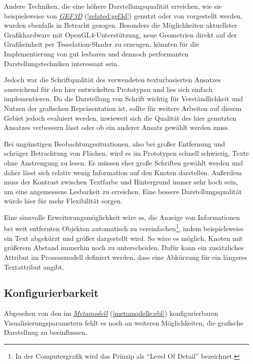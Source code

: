 \documentclass[a4paper,10pt]{sphinxmanual}
\begin{document}
Andere Techniken, die eine höhere Darstellungsqualität erreichen, wie sie beispielsweise von {\hyperref[related:gef3d]{\emph{GEF3D}}} (\autoref*{related:gef3d}) genutzt oder von \cite{ray_vector_2005} vorgestellt werden, wurden ebenfalls in Betracht gezogen.
Besonders die Möglichkeiten aktuellster Grafikhardware mit OpenGL4-Unterstützung, neue Geometrien direkt auf der Grafikeinheit per Tesselation-Shader zu erzeugen, könnten für die Implementierung von gut lesbaren und dennoch performanten Darstellungstechniken interessant sein.

Jedoch war die Schriftqualität des verwendeten texturbasierten Ansatzes ausreichend für den hier entwickelten Prototypen und lies sich einfach implementieren.
Da die Darstellung von Schrift wichtig für Verständlichkeit und Nutzen der grafischen Repräsentation ist, sollte für weitere Arbeiten auf diesem Gebiet jedoch evaluiert werden, inwieweit sich die Qualität des hier genutzten Ansatzes verbessern lässt oder ob ein anderer Ansatz gewählt werden muss.

Bei ungünstigen Beobachtungssituationen, also bei großer Entfernung und schräger Betrachtung von Flächen, wird es im Prototypen schnell schwierig, Texte ohne Anstrengung zu lesen.
Es müssen eher große Schriften gewählt werden und daher lässt sich relativ wenig Information auf den Knoten darstellen.
Außerdem muss der Kontrast zwischen Textfarbe und Hintergrund immer sehr hoch sein, um eine angemessene Lesbarkeit zu erreichen. Eine bessere Darstellungsqualität würde hier für mehr Flexibilität sorgen.

Eine sinnvolle Erweiterungsmöglichkeit wäre es, die Anzeige von Informationen bei weit entfernten Objekten automatisch zu vereinfachen\footnote{
In der Computergrafik wird das Prinzip als "`Level Of Detail"' bezeichnet.
}, indem beispielsweise ein Text abgekürzt und größer dargestellt wird.
So wäre es möglich, Knoten mit größerem Abstand immerhin noch zu unterscheiden.
Dafür kann ein zusätzliches Attribut im Prozessmodell definiert werden, dass eine Abkürzung für ein längeres Textattribut angibt.


\subsection{Konfigurierbarkeit}
\label{visualisierung:konfigurierbarkeit}
Abgesehen von den im {\hyperref[metamodelle:ebl]{\emph{Metamodell}}} (\autoref*{metamodelle:ebl}) konfigurierbaren Visualisierungsparametern fehlt es noch an weiteren Möglichkeiten, die grafische Darstellung zu beeinflussen.
\end{document}
